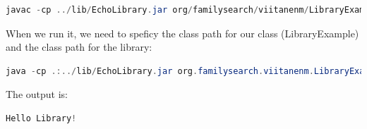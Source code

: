 \begin{lstlisting}[language=Java]
javac -cp ../lib/EchoLibrary.jar org/familysearch/viitanenm/LibraryExample.java 
\end{lstlisting}

When we run it, we need to speficy the class path for our class (LibraryExample) and the class path for the library:
\begin{lstlisting}[language=Java]
java -cp .:../lib/EchoLibrary.jar org.familysearch.viitanenm.LibraryExample
\end{lstlisting}

The output is:
\begin{lstlisting}[language=Java]
Hello Library!
\end{lstlisting}
